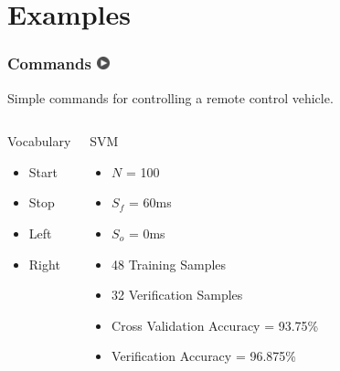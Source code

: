 \documentclass{beamer}
\begin{document}
\section{Examples}

\begin{frame}
\frametitle{Commands 
\href{images/commands.mp4}{\includegraphics[width=0.15in]{images/play.png}}}
Simple commands for controlling a remote control vehicle.
\begin{columns}[c]
  \column{1.5in}
	\begin{block}{Vocabulary}
		\begin{itemize}
		\item Start
		\item Stop
		\item Left
		\item Right
		\end{itemize}
	\end{block}
  \column{2.5in}
  	\begin{block}{SVM}
		\begin{itemize}
		\item $N$ = 100
		\item $S_f$ = 60ms
		\item $S_o$ = 0ms
		\item 48 Training Samples
		\item 32 Verification Samples
		\item \small{Cross Validation Accuracy = 93.75\%}
		\item Verification Accuracy = 96.875\%
		\end{itemize}
	\end{block}
\end{columns}
\end{frame}

\end{document}
